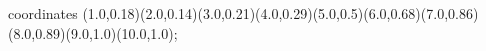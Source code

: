 					coordinates { (1.0,0.18)(2.0,0.14)(3.0,0.21)(4.0,0.29)(5.0,0.5)(6.0,0.68)(7.0,0.86)(8.0,0.89)(9.0,1.0)(10.0,1.0)};